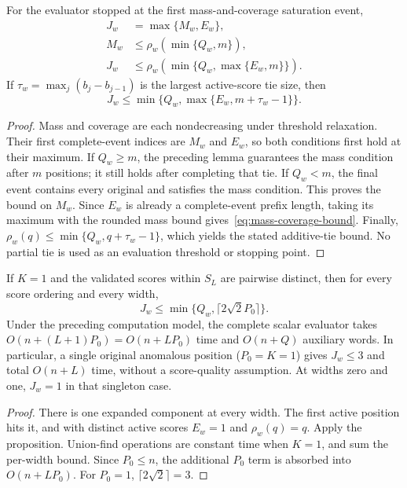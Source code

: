 \begin{proposition}
For the evaluator stopped at the first mass-and-coverage saturation event,
\begin{align}
 J_w&=\max\{M_w,E_w\},\\
 M_w&\le\rho_w(\min\{Q_w,m\}),\\
 J_w&\le\rho_w\!\left(\min\{Q_w,\max\{E_w,m\}\}\right).
 \label{eq:mass-coverage-bound}
\end{align}
If $\tau_w=\max_j(b_j-b_{j-1})$ is the largest active-score tie size, then
\[
 J_w\le\min\{Q_w,\max\{E_w,m+\tau_w-1\}\}.
\]
\end{proposition}
\begin{proof}
Mass and coverage are each nondecreasing under threshold relaxation.
Their first complete-event indices are $M_w$ and $E_w$, so both conditions
first hold at their maximum. If $Q_w\ge m$, the preceding lemma guarantees
the mass condition after $m$ positions; it still holds after completing
that tie. If $Q_w<m$, the final event contains every original and satisfies
the mass condition. This proves the bound on $M_w$. Since $E_w$ is already
a complete-event prefix length, taking its maximum with the rounded mass
bound gives~\eqref{eq:mass-coverage-bound}. Finally,
$\rho_w(q)\le\min\{Q_w,q+\tau_w-1\}$, which yields the stated additive-tie
bound. No partial tie is used as an evaluation threshold or stopping point.
\end{proof}

\begin{corollary}
If $K=1$ and the validated scores within $S_L$ are pairwise distinct, then
for every score ordering and every width,
\[
 J_w\le\min\{Q_w,\lceil2\sqrt2 P_0\rceil\}.
\]
Under the preceding computation model, the complete scalar evaluator takes
$O(n+(L+1)P_0)=O(n+LP_0)$ time and $O(n+Q)$ auxiliary words. In particular,
a single original anomalous position ($P_0=K=1$) gives $J_w\le3$ and total
$O(n+L)$ time, without a score-quality assumption. At widths zero and one,
$J_w=1$ in that singleton case.
\end{corollary}
\begin{proof}
There is one expanded component at every width. The first active position
hits it, and with distinct active scores $E_w=1$ and $\rho_w(q)=q$.
Apply the proposition. Union-find operations are constant time when $K=1$,
and sum the per-width bound. Since $P_0\le n$, the additional $P_0$ term is
absorbed into $O(n+LP_0)$. For $P_0=1$, $\lceil2\sqrt2\rceil=3$.
\end{proof}

